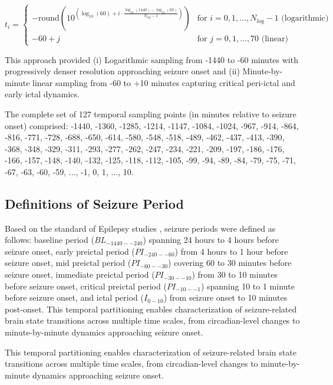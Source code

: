 \begin{equation}
t_i = \begin{cases}
-\text{round}(10^{(\log_{10}(60) + i \cdot \frac{\log_{10}(1440) - \log_{10}(60)}{N_{log}-1})}) & \text{for } i = 0, 1, \ldots, N_{log}-1 \text{ (logarithmic)} \\
-60 + j & \text{for } j = 0, 1, \ldots, 70 \text{ (linear)}
\end{cases}
\end{equation}

This approach provided (i) Logarithmic sampling from -1440 to -60 minutes with progressively denser resolution approaching seizure onset and (ii) Minute-by-minute linear sampling from -60 to +10 minutes capturing critical peri-ictal and early ictal dynamics.

The complete set of 127 temporal sampling points (in minutes relative to seizure onset) comprised: -1440, -1360, -1285, -1214, -1147, -1084, -1024, -967, -914, -864, -816, -771, -728, -688, -650, -614, -580, -548, -518, -489, -462, -437, -413, -390, -368, -348, -329, -311, -293, -277, -262, -247, -234, -221, -209, -197, -186, -176, -166, -157, -148, -140, -132, -125, -118, -112, -105, -99, -94, -89, -84, -79, -75, -71, -67, -63, -60, -59, ..., -1, 0, 1, ..., 10.


\subsection{Definitions of Seizure Period}

Based on the standard of Epilepsy studies \cite{Kuhlmann2018SeizurePA}, seizure periods were defined as follows: baseline period ($BL_{-1440--240}$) spanning 24 hours to 4 hours before seizure onset, early preictal period ($PI_{-240--60}$) from 4 hours to 1 hour before seizure onset, mid preictal period ($PI_{-60--30}$) covering 60 to 30 minutes before seizure onset, immediate preictal period ($PI_{-30--10}$) from 30 to 10 minutes before seizure onset, critical preictal period ($PI_{-10--1}$) spanning 10 to 1 minute before seizure onset, and ictal period ($I_{0-10}$) from seizure onset to 10 minutes post-onset. This temporal partitioning enables characterization of seizure-related brain state transitions across multiple time scales, from circadian-level changes to minute-by-minute dynamics approaching seizure onset.

This temporal partitioning enables characterization of seizure-related brain state transitions across multiple time scales, from circadian-level changes to minute-by-minute dynamics approaching seizure onset.


